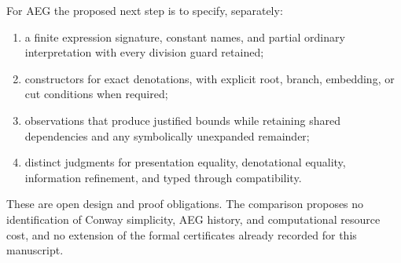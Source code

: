For AEG the proposed next step is to specify, separately:
\begin{enumerate}
 \item a finite expression signature, constant names, and partial ordinary
       interpretation with every division guard retained;
 \item constructors for exact denotations, with explicit root, branch,
       embedding, or cut conditions when required;
 \item observations that produce justified bounds while retaining shared
       dependencies and any symbolically unexpanded remainder;
 \item distinct judgments for presentation equality, denotational equality,
       information refinement, and typed through compatibility.
\end{enumerate}
These are open design and proof obligations.  The comparison proposes no
identification of Conway simplicity, AEG history, and computational resource
cost, and no extension of the formal certificates already recorded for this
manuscript.
